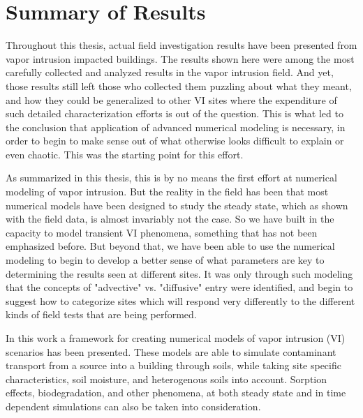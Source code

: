 \section{Summary of Results}

Throughout this thesis, actual field investigation results have been presented from vapor intrusion impacted buildings.
The results shown here were among the most carefully collected and analyzed results in the vapor intrusion field.
And yet, those results still left those who collected them puzzling about what they meant, and how they could be generalized to other VI sites where the expenditure of such detailed characterization efforts is out of the question.
This is what led to the conclusion that application of advanced numerical modeling is necessary, in order to begin to make sense out of what otherwise looks difficult to explain or even chaotic.
This was the starting point for this effort.\par

As summarized in this thesis, this is by no means the first effort at numerical modeling of vapor intrusion.
But the reality in the field has been that most numerical models have been designed to study the steady state, which as shown with the field data, is almost invariably not the case.
So we have built in the capacity to model transient VI phenomena, something that has not been emphasized before.
But beyond that, we have been able to use the numerical modeling to begin to develop a better sense of what parameters are key to determining the results seen at different sites.
It was only through such modeling that the concepts of "advective" vs. "diffusive" entry were identified, and begin to suggest how to categorize sites which will respond very differently to the different kinds of field tests that are being performed.\par

In this work a framework for creating numerical models of vapor intrusion (VI) scenarios has been presented.
These models are able to simulate contaminant transport from a source into a building through soils, while taking site specific characteristics, soil moisture, and heterogenous soils into account.
Sorption effects, biodegradation, and other phenomena, at both steady state and in time dependent simulations can also be taken into consideration.\par

